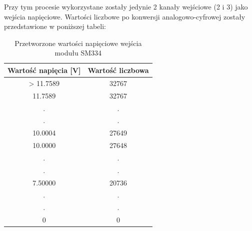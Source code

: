 Przy tym procesie wykorzystane zostały jedynie 2 kanały wejściowe (2 i 3) jako wejścia napięciowe. Wartości liczbowe po konwersji analogowo-cyfrowej zostały przedstawione w poniższej tabeli:
\begin{table}[h]
\centering
 \begin{tabular}{||c | c ||} 
 \hline
 Wartość napięcia [V] & Wartość liczbowa  \\ [0.5ex] 
 \hline\hline
 > 11.7589 & 32767  \\ 
 \hline
 11.7589 & 32767 \\
 . & . \\
 . & . \\
 10.0004 & 27649\\
 \hline
 10.0000 & 27648\\
 . & . \\
 . & . \\
 7.50000 & 20736\\
 . & . \\
 . & . \\
 0 & 0 \\
 \hline
\end{tabular}
\caption{Przetworzone wartości napięciowe wejścia modułu SM334}
\label{tab:2_wartoscio_napiecia}
\end{table}
